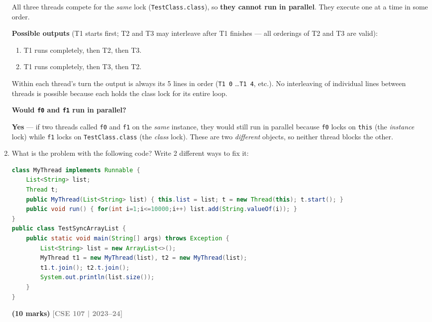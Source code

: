 \documentclass[12pt,a3paper]{article}
\newcommand{\yr}[1]{\hfill\textcolor{gray}{\small\textbf{[#1]}}}
\newcommand{\mk}[1]{\textcolor{orange!70!black}{\small\textbf{(#1 marks)}}}
\begin{document}
\begin{enumerate}
\begin{tcolorbox}
All three threads compete for the \emph{same} lock
(\texttt{TestClass.class}), so \textbf{they cannot run in parallel}.
They execute one at a time in some order.

\medskip
\textbf{Possible outputs} (T1 starts first; T2 and T3 may interleave
after T1 finishes --- all orderings of T2 and T3 are valid):

\begin{enumerate}[label=(\roman*),itemsep=1pt]
  \item T1 runs completely, then T2, then T3.
  \item T1 runs completely, then T3, then T2.
\end{enumerate}

Within each thread's turn the output is always its 5 lines in order
(\texttt{T1 0} \ldots \texttt{T1 4}, etc.).  No interleaving of
individual lines between threads is possible because each holds the
class lock for its entire loop.

\medskip
\textbf{Would \texttt{f0} and \texttt{f1} run in parallel?}

\textbf{Yes} --- if two threads called \texttt{f0} and \texttt{f1}
on the \emph{same} instance, they would still run in parallel because
\texttt{f0} locks on \texttt{this} (the \emph{instance} lock) while
\texttt{f1} locks on \texttt{TestClass.class} (the \emph{class}
lock).  These are two \emph{different} objects, so neither thread
blocks the other.

\end{tcolorbox}

\item What is the problem with the following code? Write 2 different ways to fix it:
\begin{lstlisting}[language=Java]
class MyThread implements Runnable {
    List<String> list;
    Thread t;
    public MyThread(List<String> list) { this.list = list; t = new Thread(this); t.start(); }
    public void run() { for(int i=1;i<=10000;i++) list.add(String.valueOf(i)); }
}
public class TestSyncArrayList {
    public static void main(String[] args) throws Exception {
        List<String> list = new ArrayList<>();
        MyThread t1 = new MyThread(list), t2 = new MyThread(list);
        t1.t.join(); t2.t.join();
        System.out.println(list.size());
    }
}
\end{lstlisting}
\mk{10}
\yr{CSE 107 | 2023--24}

\begin{tcolorbox}[enhanced,breakable,ansbox,
  colback=cF!4,colframe=cF,boxrule=0.8pt,arc=5pt,
  title={\textbf{Answer --- Race Condition on \texttt{ArrayList}: Problem \& Two Fixes}},
  fonttitle=\bfseries\color{white},colbacktitle=cF]


\end{tcolorbox}
\end{enumerate}
\end{document}
